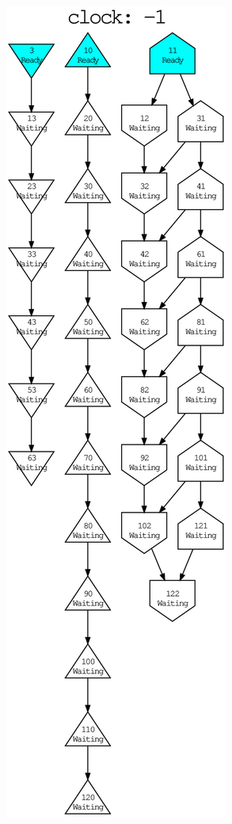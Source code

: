 \begin{figure}[htpb]
    \centering
    \begin{subfigure}[b]{0.5\textwidth}
        \centering
        \includegraphics[scale=0.45]{evaluation/dot_files/example_graph_initial.eps}

\end{subfigure}
\end{figure}
